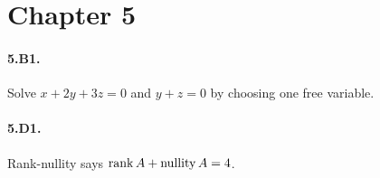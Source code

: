 \section*{Chapter 5}
\paragraph{5.B1.} Solve $x+2y+3z=0$ and $y+z=0$ by choosing one free variable.
\paragraph{5.D1.} Rank-nullity says $\operatorname{rank} A+\operatorname{nullity} A=4$.

